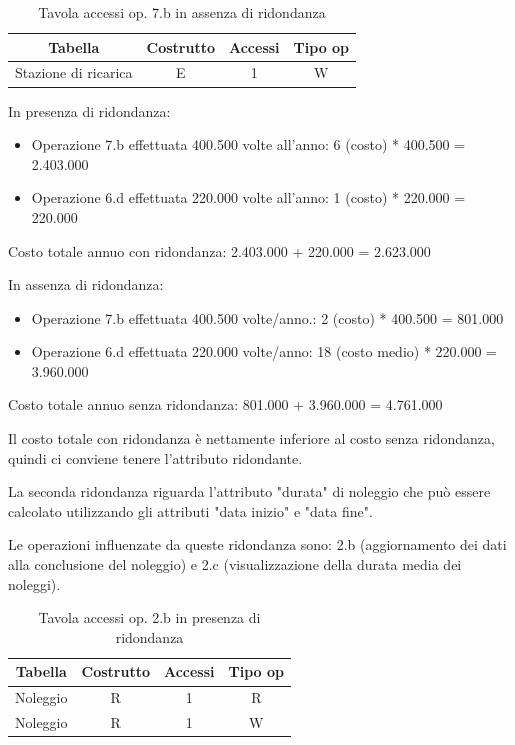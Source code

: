 \documentclass{article}
\begin{document}
\begin{table}[h]
  \centering
  \begin{tabular}{|c|c|c|c|}
    \hline
    Tabella & Costrutto & Accessi & Tipo op \\ \hline
    Stazione di ricarica & E & 1 & W \\ \hline
  \end{tabular}
  \caption{Tavola accessi op. 7.b in assenza di ridondanza}
  \label{tab:label}
\end{table}

In presenza di ridondanza: 

\begin{itemize}
    \item Operazione 7.b effettuata 400.500 volte all'anno: 6 (costo) * 400.500 = 2.403.000
    \item Operazione 6.d effettuata 220.000 volte all'anno: 1 (costo) * 220.000 = 220.000
\end{itemize}

Costo totale annuo con ridondanza: 2.403.000 + 220.000 = 2.623.000

In assenza di ridondanza: 
\begin{itemize}
    \item Operazione 7.b effettuata 400.500 volte/anno.: 2 (costo) * 400.500 = 801.000
    \item Operazione 6.d effettuata 220.000 volte/anno: 18 (costo medio) * 220.000 = 3.960.000
\end{itemize}

Costo totale annuo senza ridondanza: 801.000 + 3.960.000 = 4.761.000

Il costo totale con ridondanza è nettamente inferiore al costo senza ridondanza, quindi ci conviene tenere l'attributo ridondante.

La seconda ridondanza riguarda l'attributo "durata" di noleggio che può essere calcolato utilizzando gli attributi "data inizio" e "data fine". 

Le operazioni influenzate da queste ridondanza sono: 2.b (aggiornamento dei dati alla conclusione del noleggio) e 2.c (visualizzazione della durata media dei noleggi). 

\begin{table}[H]
  \centering
  \begin{tabular}{|c|c|c|c|}
    \hline
    Tabella & Costrutto & Accessi & Tipo op \\ \hline
    Noleggio & R & 1 & R  \\ \hline %
    Noleggio & R & 1 & W  \\ \hline 
  \end{tabular}
  \caption{Tavola accessi op. 2.b in presenza di ridondanza}
\end{table}
\end{document}
